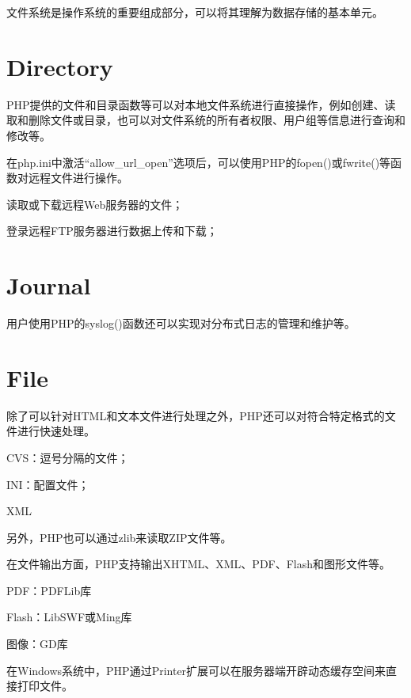 文件系统是操作系统的重要组成部分，可以将其理解为数据存储的基本单元。


\section{Directory}


PHP提供的文件和目录函数等可以对本地文件系统进行直接操作，例如创建、读取和删除文件或目录，也可以对文件系统的所有者权限、用户组等信息进行查询和修改等。

在php.ini中激活“allow\_url\_open”选项后，可以使用PHP的fopen()或fwrite()等函数对远程文件进行操作。

\begin{compactitem}
\item 读取或下载远程Web服务器的文件；
\item 登录远程FTP服务器进行数据上传和下载；
\end{compactitem}

\section{Journal}


用户使用PHP的syslog()函数还可以实现对分布式日志的管理和维护等。


\section{File}


除了可以针对HTML和文本文件进行处理之外，PHP还可以对符合特定格式的文件进行快速处理。

\begin{compactitem}
\item CVS：逗号分隔的文件；
\item INI：配置文件；
\item XML
\end{compactitem}

另外，PHP也可以通过zlib来读取ZIP文件等。

在文件输出方面，PHP支持输出XHTML、XML、PDF、Flash和图形文件等。

\begin{compactitem}
\item PDF：PDFLib库
\item Flash：LibSWF或Ming库
\item 图像：GD库
\end{compactitem}

在Windows系统中，PHP通过Printer扩展可以在服务器端开辟动态缓存空间来直接打印文件。



